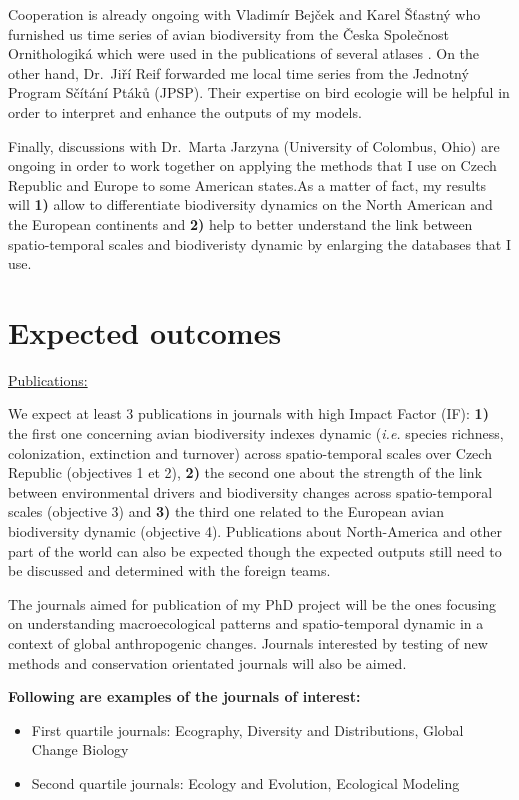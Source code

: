 \documentclass[
  12pt,
  oneside]{report}
\providecommand{\tightlist}{%
  \setlength{\itemsep}{0pt}\setlength{\parskip}{0pt}}
\begin{document}
Cooperation is already ongoing with Vladimír Bejček and Karel Šťastný who furnished us time series of avian biodiversity from the Česka Společnost Ornithologiká which were used in the publications of several atlases \autocite[see][]{bejcek_velke_2016}. On the other hand, Dr.~Jiří Reif forwarded me local time series from the Jednotný Program Sčítání Ptáků (JPSP). Their expertise on bird ecologie will be helpful in order to interpret and enhance the outputs of my models.

Finally, discussions with Dr.~Marta Jarzyna (University of Colombus, Ohio) are ongoing in order to work together on applying the methods that I use on Czech Republic and Europe to some American states.As a matter of fact, my results will \textbf{1)} allow to differentiate biodiversity dynamics on the North American and the European continents and \textbf{2)} help to better understand the link between spatio-temporal scales and biodiveristy dynamic by enlarging the databases that I use.

\hypertarget{outcomes}{%
\chapter{Expected outcomes}\label{outcomes}}

\underline{Publications:}

We expect at least 3 publications in journals with high Impact Factor (IF): \textbf{1)} the first one concerning
avian biodiversity indexes dynamic (\emph{i.e.} species richness, colonization, extinction and turnover) across
spatio-temporal scales over Czech Republic (objectives 1 et 2), \textbf{2)} the second one about the
strength of the link between environmental drivers and biodiversity changes across spatio-temporal
scales (objective 3) and \textbf{3)} the third one related to the European avian biodiversity dynamic (objective 4). Publications about North-America and other part of the world can also be expected though the expected outputs still need to be discussed and determined with the foreign teams.

The journals aimed for publication of my PhD project will be the ones focusing on understanding
macroecological patterns and spatio-temporal dynamic in a context of global anthropogenic changes.
Journals interested by testing of new methods and conservation orientated journals will also be aimed.

\textbf{Following are examples of the journals of interest:}

\begin{itemize}
\tightlist
\item
  First quartile journals: Ecography, Diversity and Distributions, Global Change Biology
\item
  Second quartile journals: Ecology and Evolution, Ecological Modeling
\end{itemize}
\end{document}
